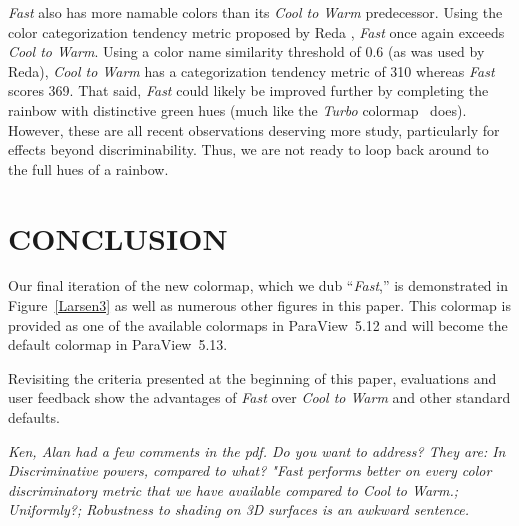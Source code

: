 \documentclass{IEEEcsmag}
\newcommand*{\colormap}[1]{\textsl{#1}\xspace}
\newcommand*{\coolwarm}{\colormap{Cool to Warm}}
\newcommand*{\fast}{\colormap{Fast}}
\newcommand*{\turbo}{\colormap{Turbo}}
\begin{document}
\fast also has more namable colors than its \coolwarm predecessor.
Using the color categorization tendency metric proposed by Reda \cite{Reda2022}, \fast once again exceeds \coolwarm.
Using a color name similarity threshold of 0.6 (as was used by Reda), \coolwarm has a categorization tendency metric of 310 whereas \fast scores 369.
That said, \fast could likely be improved further by completing the rainbow with distinctive green hues (much like the \turbo colormap~\cite{Mikhailov2019} does).
However, these are all recent observations deserving more study, particularly for effects beyond discriminability.
Thus, we are not ready to loop back around to the full hues of a rainbow.


\section{CONCLUSION}

Our final iteration of the new colormap, which we dub ``\fast,'' is demonstrated in Figure~\ref{Larsen3} as well as numerous other figures in this paper.
This colormap is provided as one of the available colormaps in ParaView~5.12 and will become the default colormap in ParaView~5.13.

Revisiting the criteria presented at the beginning of this paper, evaluations and user feedback show the advantages of \fast over \coolwarm and other standard defaults.



\textit{Ken, Alan had a few comments in the pdf. Do you want to address? They are: In Discriminative powers, compared to what?  "Fast performs better on every color discriminatory metric that we have available compared to Cool to Warm.; Uniformly?; Robustness to shading on 3D surfaces is an awkward sentence.}
\end{document}

